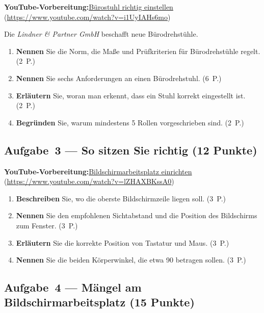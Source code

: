 \documentclass[11pt, a4paper]{article}
\begin{document}
\noindent\textbf{\color{bfwAccent}YouTube-Vorbereitung:}\enspace \href{https://www.youtube.com/watch?v=i1UyIAHs6mo}{Bürostuhl richtig einstellen} (\url{https://www.youtube.com/watch?v=i1UyIAHs6mo})

\medskip
Die \emph{Lindner \& Partner GmbH} beschafft neue Bürodrehstühle.

\begin{enumerate}[label=(\alph*)]
  \item \textbf{Nennen} Sie die Norm, die Maße und Prüfkriterien für Bürodrehstühle regelt. \hfill (2~P.)
  \item \textbf{Nennen} Sie sechs Anforderungen an einen Bürodrehstuhl. \hfill (6~P.)
  \item \textbf{Erläutern} Sie, woran man erkennt, dass ein Stuhl korrekt eingestellt ist. \hfill (2~P.)
  \item \textbf{Begründen} Sie, warum mindestens 5 Rollen vorgeschrieben sind. \hfill (2~P.)
\end{enumerate}

\subsection*{Aufgabe~3 --- So sitzen Sie richtig (12 Punkte)}

\noindent\textbf{\color{bfwAccent}YouTube-Vorbereitung:}\enspace \href{https://www.youtube.com/watch?v=lZHAXBKssA0}{Bildschirmarbeitsplatz einrichten} (\url{https://www.youtube.com/watch?v=lZHAXBKssA0})

\medskip
\begin{enumerate}[label=(\alph*)]
  \item \textbf{Beschreiben} Sie, wo die oberste Bildschirmzeile liegen soll. \hfill (3~P.)
  \item \textbf{Nennen} Sie den empfohlenen Sichtabstand und die Position des Bildschirms zum Fenster. \hfill (3~P.)
  \item \textbf{Erläutern} Sie die korrekte Position von Tastatur und Maus. \hfill (3~P.)
  \item \textbf{Nennen} Sie die beiden Körperwinkel, die etwa 90\textdegree{} betragen sollen. \hfill (3~P.)
\end{enumerate}

\subsection*{Aufgabe~4 --- Mängel am Bildschirmarbeitsplatz (15 Punkte)}
\end{document}
